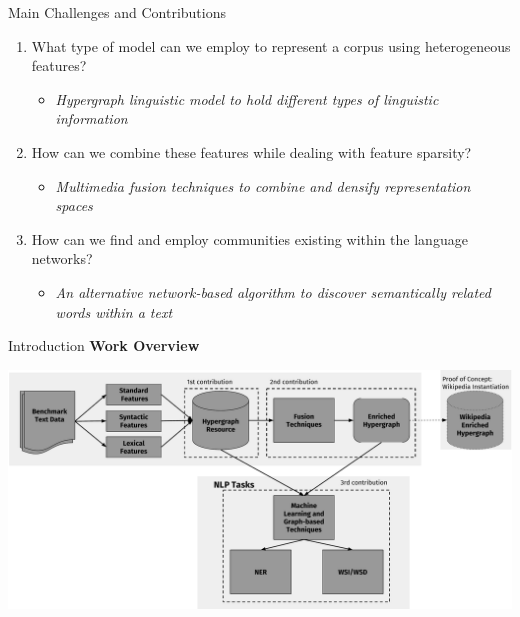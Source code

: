 \documentclass[10pt,xcolor=table]{beamer}
\begin{document}
\begin{frame}{Main Challenges and Contributions}
	\begin{enumerate}[<+- | alert@+>]
		\item What type of model can we employ to represent a corpus using heterogeneous features?
		\begin{itemize}
		\item \textit{Hypergraph linguistic model to hold different types of  linguistic information}
		\end{itemize}
		
		\item How can we combine these features while dealing with feature sparsity?
		\begin{itemize}
		\item \textit{Multimedia fusion techniques to combine and densify representation spaces}	    	 
		\end{itemize}
		\item How can we find and employ communities existing within the language networks?
		\begin{itemize}
		\item \textit{An alternative network-based algorithm to discover semantically related words within a text}
		\end{itemize}
		
	\end{enumerate}%
 \vspace{\textheight}
\end{frame}


\begin{frame}{Introduction}
\large  \textbf{Work Overview} \hfill
\begin{center}
\includegraphics[width=1.04\linewidth]{image2/Chapitre1/main_diag_presi.pdf}
\end{center}

 \vspace{\textheight}
\end{frame}
\end{document}
